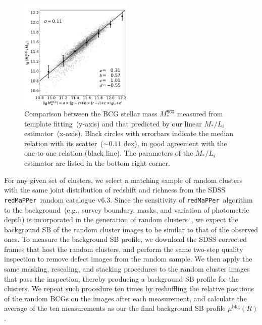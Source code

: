 \documentclass[fleqn,usenatbib]{mnras}
\newcommand{\msbcg}{M_*^{\texttt{BCG}}}
\newcommand\redmapper{\texttt{redMaPPer}}
\begin{document}
\begin{figure}
    \includegraphics[width=0.48\textwidth]{fig/Mass_to_Li_estimation.pdf}
    \caption{Comparison between the BCG stellar mass $\msbcg$ measured from
    template fitting~(y-axis) and that predicted by our linear $M_*/L_i$
    estimator~(x-axis). Black circles with errorbars indicate the median
    relation with its scatter~(${\sim}0.11$ dex), in good agreement with
    the one-to-one relation (black line). The parameters of the $M_*/L_i$
    estimator are listed in the bottom right corner.  \label{fig:func_M2L} }
\end{figure}

For any given set of clusters, we select a matching sample of random
clusters with the same joint distribution of redshift and richness from the
SDSS \redmapper~random catalogue v6.3.  Since the sensitivity of
\redmapper~algorithm to the background~(e.g., survey boundary, masks, and
variation of photometric depth) is incorporated in the generation of random
clusters~\citep{Rykoff2016}, we expect the background SB of the random
cluster images to be similar to that of the observed ones. To measure the
background SB profile, we download the SDSS corrected frames that host the
random clusters, and perform the same two-step quality inspection to remove
defect images from the random sample.  We then apply the same masking,
rescaling, and stacking procedures to the random cluster images that pass
the inspection, thereby producing a background SB profile for the clusters.
We repeat such procedure ten times by reshuffling the relative positions of
the random BCGs on the images after each measurement, and calculate the average of
the ten measurements as our the final background SB profile
$\mu^{\mathrm{bkg}}(R)$.
\end{document}
